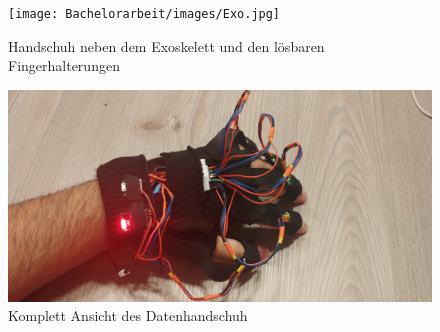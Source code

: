 \begin{figure}[h]
	\centering
    \texttt{[image: Bachelorarbeit/images/Exo.jpg]}
    \caption{Handschuh neben dem Exoskelett und den lösbaren Fingerhalterungen}
    \label{fig:Exo}
\end{figure}

\begin{figure}[h]
	\centering
    \includegraphics[width=1\columnwidth]{Bachelorarbeit/images/FullView.jpg}
    \caption{Komplett Ansicht des Datenhandschuh}
    \label{fig:FullView}
\end{figure}
